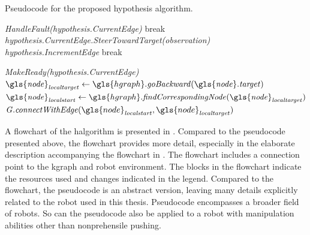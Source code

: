 \noindent
\begin{algorithm}[H]
  \caption{Pseudocode for the proposed hypothesis algorithm.}\label{pseudocode:halgorithm}
  \begin{algorithmic}[1]

    \hspace{-0.9cm}\colorbox{my_grey}{\parbox{\linewidth}{%

        \hspace{-0.1cm}\colorbox{my_yellow}{\parbox{\linewidth}{%

            \hspace{-0.1cm}\colorbox{my_light_blue}{\parbox{\linewidth}{%
                 
                \State \textit{HandleFault(\gls{hypothesis}.CurrentEdge)}
                \State break
                \EndIf
                \State \textit{\gls{hypothesis}.CurrentEdge.SteerTowardTarget(\gls{observation})}
                  \State \textit{\gls{hypothesis}.IncrementEdge}
                \Else
                  \State break
                \EndIf
                \EndIf
                \EndWhile
            }}
            \Else
            \State \textit{MakeReady(\gls{hypothesis}.CurrentEdge)}
            \EndIf
            \Else
            \State $\mathit{\gls{node}_{localtarget}} \leftarrow \gls{hgraph}.\mathit{goBackward(\gls{node}.target)}$
            \State $\mathit{\gls{node}_{localstart}} \leftarrow \gls{hgraph}.\mathit{findCorrespondingNode(\gls{node}_{localtarget})}$
            \State $\mathit{G.connectWithEdge}(\gls{node}_\mathit{localstart}, \gls{node}_\mathit{localtarget})$
            \EndIf
            \EndWhile
        }}
        \EndFor
    }}
  \end{algorithmic}
\end{algorithm}

A flowchart of the \ac{halgorithm} is presented in . Compared to the pseudocode presented above, the flowchart provides more detail, especially in the elaborate description accompanying the flowchart in . The flowchart includes a connection point to the \ac{kgraph} and robot environment. The blocks in the flowchart indicate the resources used and changes indicated in the legend. Compared to the flowchart, the pseudocode is an abstract version, leaving many details explicitly related to the robot used in this thesis. Pseudocode encompasses a broader field of robots. So can the pseudocode also be applied to a robot with manipulation abilities other than nonprehensile pushing.\bs

